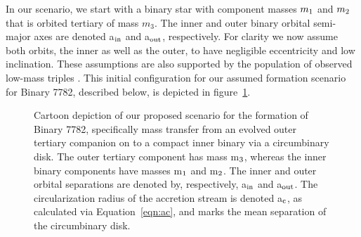 \documentclass{aastex62}
\begin{document}
In our scenario, we start with a binary star with component masses
$m_{\rm 1}$ and $m_{\rm 2}$ that is orbited tertiary of mass
$m_3$. The inner and outer binary orbital semi-major axes are denoted
a$_{\rm in}$ and a$_{\rm out}$, respectively.  For clarity we now
assume both orbits, the inner as well as the outer, to have negligible
eccentricity and low inclination.  These assumptions are also
supported by the population of observed low-mass triples
\cite{2010yCat..73890925T,moe18}.  This initial configuration for our
assumed formation scenario for Binary 7782, described below, is
depicted in figure~\ref{fig:fig1}.

\begin{figure}[ht!]
\caption{Cartoon depiction of our proposed scenario for the formation
  of Binary 7782, specifically mass transfer from an evolved outer
  tertiary companion on to a compact inner binary via a circumbinary
  disk.  The outer tertiary component has mass m$_{\rm 3}$, whereas
  the inner binary components have masses m$_{\rm 1}$ and m$_{\rm 2}$.
  The inner and outer orbital separations are denoted by,
  respectively, a$_{\rm in}$ and a$_{\rm out}$.  The circularization
  radius of the accretion stream is denoted a$_{\rm c}$, as calculated
  via Equation~\ref{eqn:ac}, and marks the mean separation of the
  circumbinary disk.
\label{fig:fig1}}
\end{figure}
\end{document}
